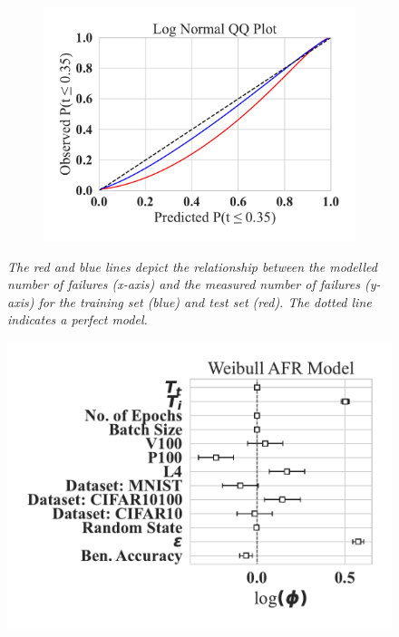 \documentclass[conference]{IEEEtran}
\newcommand{\cm}[1]{\textit{{\color{blue}#1}}}
\begin{document}
{\begin{figure}[h!]
\begin{subfigure}[b]{.3\linewidth}
        \includegraphics[width=\linewidth,clip]{plots/combined/log_normal_qq.pdf}
        \caption{}
    \end{subfigure}
    \caption{\cm{The red and blue lines depict the relationship between the modelled number of failures (x-axis) and the measured number of failures (y-axis) for the training set (blue) and test set (red). The dotted line indicates a perfect model.}}
    \label{fig:qq}
\end{figure}
\begin{figure}[h!]
    \centering
    \captionsetup[subfigure]{skip=0pt} %
        \centering
        \includegraphics[width=\linewidth]{plots/combined/weibull_aft.pdf}

\end{figure}}
\end{document}
